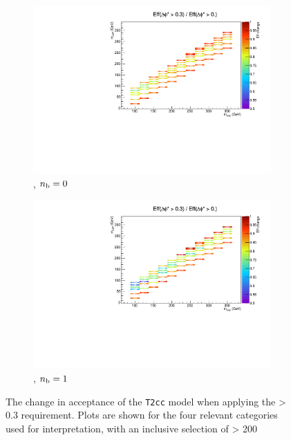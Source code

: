 \begin{figure}[h!]
\begin{subfigure}[b]{0.46\textwidth}
    \includegraphics[width=\textwidth]
    {Figs/sms/t2cc/v37/eff_changes/eff_compare_2d_T2cc_v37_vs_T2cc_v38_eq0b_ge4j}
    \caption{\njhigh, $n_{\text{b}} = 0$}
    \label{fig:t2cc_dphistar_eq0b_ge4j}
  \end{subfigure}
  \begin{subfigure}[b]{0.46\textwidth}
    \includegraphics[width=\textwidth]
    {Figs/sms/t2cc/v37/eff_changes/eff_compare_2d_T2cc_v37_vs_T2cc_v38_eq1b_ge4j}
    \caption{\njhigh, $n_{\text{b}} = 1$}
    \label{fig:t2cc_dphistar_eq1b_ge4j}
  \end{subfigure}
  \caption{The change in acceptance of the \texttt{T2cc} model when applying
  the \mindphistar > 0.3 requirement. Plots are shown for the four relevant
  categories used for interpretation, with an inclusive selection of \HT >
  200~\gev}
  \label{fig:t2cc_dphistar_effchange}
\end{figure}

